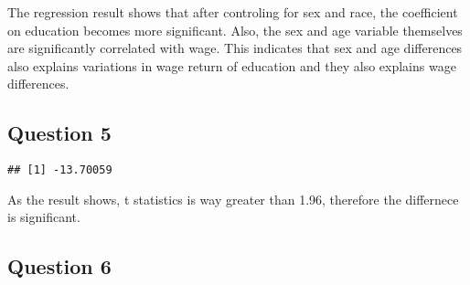 \documentclass[
]{article}
\newenvironment{Shaded}{\begin{snugshade}}{\end{snugshade}}
\newcommand{\DataTypeTok}[1]{\textcolor[rgb]{0.13,0.29,0.53}{#1}}
\newcommand{\DecValTok}[1]{\textcolor[rgb]{0.00,0.00,0.81}{#1}}
\newcommand{\FloatTok}[1]{\textcolor[rgb]{0.00,0.00,0.81}{#1}}
\newcommand{\KeywordTok}[1]{\textcolor[rgb]{0.13,0.29,0.53}{\textbf{#1}}}
\newcommand{\NormalTok}[1]{#1}
\newcommand{\OperatorTok}[1]{\textcolor[rgb]{0.81,0.36,0.00}{\textbf{#1}}}
\newcommand{\StringTok}[1]{\textcolor[rgb]{0.31,0.60,0.02}{#1}}
\begin{document}
The regression result shows that after controling for sex and race, the
coefficient on education becomes more significant. Also, the sex and age
variable themselves are significantly correlated with wage. This
indicates that sex and age differences also explains variations in wage
return of education and they also explains wage differences.

\hypertarget{question-5}{%
\subsection{Question 5}\label{question-5}}

\begin{Shaded}
\end{Shaded}

\begin{verbatim}
## [1] -13.70059
\end{verbatim}

As the result shows, t statistics is way greater than 1.96, therefore
the differnece is significant.

\hypertarget{question-6}{%
\subsection{Question 6}\label{question-6}}
\end{document}

